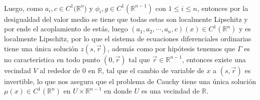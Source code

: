 \begin{homeworkProblem}
\begin{solucion}
\begin{align*}
    \end{align*}
    Luego, como $a_i, c\in C^1(\mathbb{R}^n$) y $\phi_i, g \in C^1(\mathbb{R}^{n-1})$ con $1\leq i\leq n$, entonces por la desigualdad del valor medio se tiene que todas estas son localmente Lipschitz y por ende el acoplamiento de estás, luego $(a_1,a_2,\cdots,a_n,c)(x) \in C^1(\mathbb{R}^n)$ y es localmente Lipschitz, por lo que el sistema de ecuaciones diferenciales ordinarias tiene una única solución $z(s,\vec{r})$, además como por hipótesis tenemos que $\Gamma$ es no característica en todo punto  $(0,\vec{r})$ tal que $\vec{r}\in\mathbb{R}^{n-1}$, entonces existe una vecindad $V$ al rededor de $0$ en $\mathbb{R}$, tal que el cambio de variable de  $x$ a $(s,\vec{r})$ es invertible, lo que nos asegura que el problema de Cauchy tiene una única solución $\mu(x)\in C^{1}(\mathbb{R}^{n})$ en $U\times \mathbb{R}^{n-1}$ en donde $U$ es una vecindad de $\mathbb{R}$.
    \demostrado
 \end{solucion}
\end{homeworkProblem}

